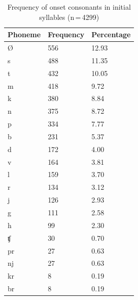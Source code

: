 \begin{table}\centering
\caption[Frequency of onset consonants in initial syllables]{Frequency of onset
consonants in initial syllables (n\,=\,4299)}
\begin{tabu} to 0.67\linewidth{X X[c] X[c]}
\tableheaderfont\toprule
Phoneme
	& Frequency
	& Percentage
	\\
	
\toprule

Ø
	& 556
	& 12.93\pct
	\\

\midrule

s
	& 488
	& 11.35\pct
	\\

t
	& 432
	& 10.05\pct
	\\

m
	& 418
	& 9.72\pct
	\\

k
	& 380
	& 8.84\pct
	\\

n
	& 375
	& 8.72\pct
	\\

p
	& 334
	& 7.77\pct
	\\

b
	& 231
	& 5.37\pct
	\\

d
	& 172
	& 4.00\pct
	\\

v
	& 164
	& 3.81\pct
	\\

l
	& 159
	& 3.70\pct
	\\

r
	& 134
	& 3.12\pct
	\\

j
	& 126
	& 2.93\pct
	\\

g
	& 111
	& 2.58\pct
	\\

h
	& 99
	& 2.30\pct
	\\

ʧ
	& 30
	& 0.70\pct
	\\

pr
	& 27
	& 0.63\pct
	\\

nj
	& 27
	& 0.63\pct
	\\

kr
	& 8
	& 0.19\pct
	\\

br
	& 8
	& 0.19\pct
	\\


\end{tabu}
\end{table}
